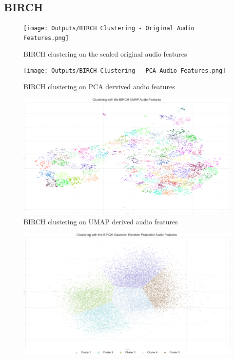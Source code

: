 \begin{appendix}
\subsection{BIRCH}
\begin{figure}[!htb]
    \centering
    \texttt{[image: Outputs/BIRCH Clustering - Original Audio Features.png]}
    \caption{BIRCH clustering on the scaled original audio features}
    \label{fig:birch-first}
\end{figure}
\begin{figure}[!htb]
    \centering
    \texttt{[image: Outputs/BIRCH Clustering - PCA Audio Features.png]}
    \caption{BIRCH clustering on PCA dervived audio features}
    \label{fig:birch-second}
\end{figure}
\begin{figure}[!htb]
    \centering
    \includegraphics[scale=0.08]{Outputs/BIRCH Clustering - UMAP Audio Features.png}
    \caption{BIRCH clustering on UMAP derived audio features}
    \label{fig:birch-third}
\end{figure}
\begin{figure}[!htb]
    \centering
    \includegraphics[scale=0.08]{Outputs/BIRCH Clustering - Gaussian Random Projections Audio Features.png}

\end{figure}
\end{appendix}
